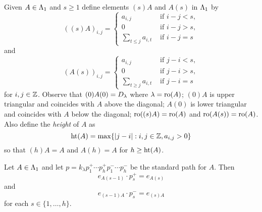 \documentclass[a4paper, 11pt]{report}
\begin{document}
Given $A\in\Lambda_1{}$ and $s\geq 1$ define elements $(s)A$ and $A(s)$ in $\Lambda_1{}$ by
\begin{equation*}
\left((s)A\right)_{i,j} = \begin{cases}
a_{i,j} &\text{ if } i-j<s,\\
0 &\text{ if } i-j>s,\\
\sum_{t\le j} a_{i,t} &\text{ if } i-j=s
\end{cases}
\end{equation*}
and
\begin{equation*}
\left(A(s)\right)_{i,j} = \begin{cases}
a_{i,j} &\text{ if } j-i<s,\\
0 &\text{ if } j-i>s,\\
\sum_{t\geq j} a_{i,t} &\text{ if } j-i=s
\end{cases}
\end{equation*}
for $i,j\in\mathbb{Z}$. Observe that $(0)A(0)=D_{\lambda}$ where $\lambda=\operatorname{ro}(A)$; $(0)A$ is upper triangular and coincides with $A$ above the diagonal; $A(0)$ is lower triangular and coincides with $A$ below the diagonal; $\operatorname{ro}((s)A)=\operatorname{ro}(A)$ and $\operatorname{ro}(A(s))=\operatorname{ro}(A)$. Also define the \emph{height} of $A$ as
\begin{equation*}
\operatorname{ht}(A) = \max\{|j-i|:i,j\in\mathbb{Z}, a_{i,j}>0\}
\end{equation*}
so that $(h)A=A$ and $A(h)=A$ for $h\geq\operatorname{ht}(A)$.

\begin{lemma}\label{lemma:slice-by-slice}
Let $A\in\Lambda_1{}$ and let $p=k_\lambda p_1^+ \cdots p_h^+ p_1^-\cdots p_h^-$ be the standard path for $A$. Then
\begin{equation*}
e_{A(s-1)}\cdot p_s^+ = e_{A(s)}
\end{equation*}
and
\begin{equation*}
e_{(s-1)A}\cdot p_s^- = e_{(s)A}
\end{equation*}
for each $s\in\{1,\ldots,h\}$.
\end{lemma}
\end{document}
